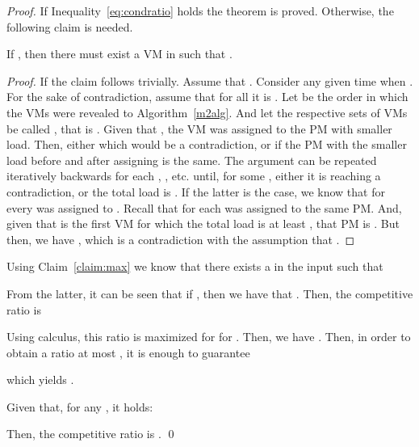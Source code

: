 \begin{proof}
If Inequality~\ref{eq:condratio} holds the theorem is proved. Otherwise, the following claim is needed.
\begin{claim}
\label{claim:max}
If , then there must exist a VM  in  such that .
\end{claim}
\begin{proof}
If  the claim follows trivially. Assume that .
Consider any given time when .
For the sake of contradiction, assume that for all  it is .
Let  be the order in which the VMs were revealed to Algorithm~\ref{m2alg}.
And let the respective sets of VMs be called , that is .
Given that , the VM  was assigned to the PM with smaller load. Then, either  which would be a contradiction, or if  the
PM with the smaller load before and after assigning  is the same.
The argument can be repeated iteratively backwards for each , , etc. until, for some , either it is  reaching a contradiction, or the total load is .
If the latter is the case, we know that for  every  was assigned to .
Recall that for  each  was assigned to the same PM. And, given that  is the first VM for which the total load is at least , that PM is .
But then, we have , which is a contradiction with the assumption that .
\end{proof}

Using Claim~\ref{claim:max} we know that there exists a  in the input such that

From the latter, it can be seen that if , then we have that .
Then, the competitive ratio  is

Using calculus, this ratio is maximized for  for . Then, we have
.
Then, in order to obtain a ratio at most , it is enough to guarantee

which yields
.

Given that, for any , it holds:

Then, the competitive ratio is
.
\qed
\end{proof}
